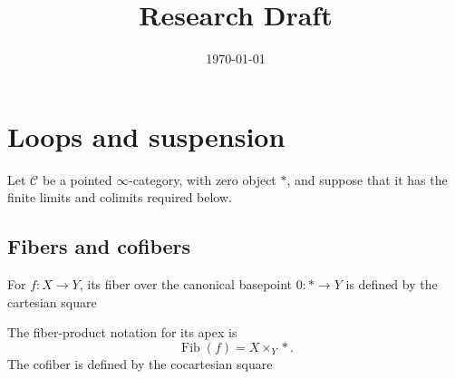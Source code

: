\documentclass{amsart}
\title{Research Draft}
\date{\today}
\begin{document}
\maketitle
\tableofcontents

\newpage

\section{Loops and suspension}\label{sec-loops-suspension}

Let \(\mathcal C\) be a pointed \(\infty\)-category, with zero object
\(*\), and suppose that it has the finite limits and colimits required
below.

\subsection{Fibers and cofibers}\label{sec-cobase-changes}

For \(f\colon X\to Y\), its fiber over the canonical basepoint
\(0\colon *\to Y\) is defined by the cartesian square

\begin{Shaded}
\begin{Highlighting}[]
\NormalTok{\{}\NormalTok{\}}
  \NormalTok{[r,"p\_X"]}
  \NormalTok{[d,"p\_*"\textquotesingle{}]}
  \NormalTok{[dr,phantom,very near start,"}\NormalTok{"] \&}
\NormalTok{[d,"f"]}\FunctionTok{\textbackslash{}\textbackslash{}}
\NormalTok{* }
\NormalTok{\{}\NormalTok{\}}
\end{Highlighting}
\end{Shaded}

The fiber-product notation for its apex is \[
\operatorname{Fib}(f)=X\times_Y *.
\] The cofiber is defined by the cocartesian square
\end{document}
